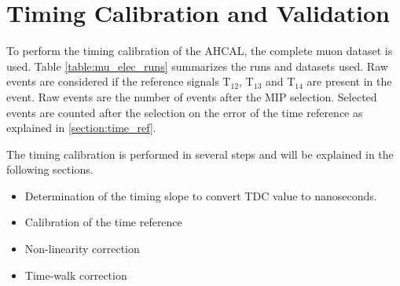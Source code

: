 \chapter{Timing Calibration and Validation}

To perform the timing calibration of the AHCAL, the complete muon dataset is used. Table \ref{table:mu_elec_runs} summarizes the runs and datasets used. Raw events are considered if the reference signals T$_{12}$,  T$_{13}$ and T$_{14}$ are present in the event. Raw events are the number of events after the MIP selection. Selected events are counted after the selection on the error of the time reference as explained in \ref{section:time_ref}.

\begin{table}[htb!]
	\centering
	\caption{Table with the run statistic before and after selection used for timing calibration.}
	\label{table:mu_elec_runs}
\end{table}

The timing calibration is performed in several steps and will be explained in the following sections.
\begin{itemize}
	\item Determination of the timing slope to convert TDC value to nanoseconds.
	\item Calibration of the time reference
	\item Non-linearity correction
	\item Time-walk correction
\end{itemize}

